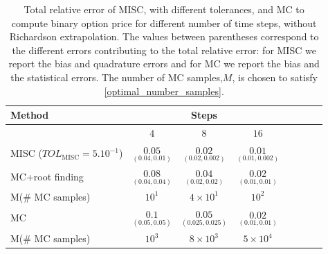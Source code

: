 \begin{table}[h!]
	\centering
	\begin{tabular}{l*{6}{c}r}
		\toprule[1.5pt]
	Method & & Steps  &     \\
	\hline
	        & $4$ & $8$ & $16$  \\
		\hline
		MISC ($TOL_{\text{MISC}}=5.10^{-1}$)   & $\underset{(0.04,0.01 )}{\mathbf{0.05}}$ & $\underset{(0.02,0.002)}{\mathbf{ 0.02}}$ & $\underset{(0.01,0.002)}{\mathbf{0.01}}$  \\
		\hline
		MC+root finding   &   $\underset{(0.04,0.04 )}{\mathbf{0.08}}$ & $\underset{(0.02,0.02)}{\mathbf{0.04}}$ & $\underset{(0.01,0.01)}{\mathbf{0.02}}$  \\	
			M(\# MC samples)   & $ 10^1$  & $4 \times 10^1$  & $  10^2$ \\	
		\hline
			MC     & $\underset{(0.05,0.05)}{\mathbf{0.1}}$ & $\underset{(0.025,0.025 )}{\mathbf{0.05}}$ & $\underset{(0.01,0.01 )}{\mathbf{0.02}}$  \\	
			M(\# MC samples)   & $ 10^3$  & $8 \times 10^3$  & $ 5 \times 10^4$ \\	
			\bottomrule[1.25pt]
	\end{tabular}
	\caption{Total relative error of MISC, with different tolerances, and MC to compute binary option price for different number of time steps, without Richardson extrapolation. The values between parentheses correspond to the different errors contributing to the total relative error: for MISC we report the bias and quadrature errors and for MC we report the bias and the statistical errors. The number of MC samples,$ M$, is chosen to satisfy \eqref{optimal_number_samples}.}
	\label{Total error of MISC and MC to compute Binary option price of the different tolerances for different number of time steps, without Richardson extrapolation. The numbers between parentheses are the corresponding absolute errors.}
\end{table}


